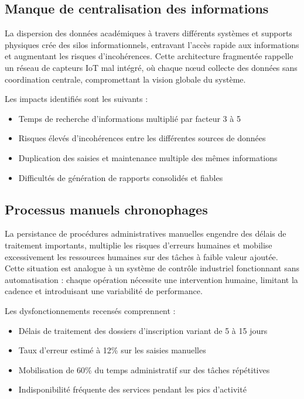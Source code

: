 \documentclass[12pt,a4paper]{report}
\begin{document}
\subsection{Manque de centralisation des informations}

La dispersion des données académiques à travers différents systèmes et supports physiques crée des silos informationnels, entravant l'accès rapide aux informations et augmentant les risques d'incohérences. Cette architecture fragmentée rappelle un réseau de capteurs IoT mal intégré, où chaque nœud collecte des données sans coordination centrale, compromettant la vision globale du système.

Les impacts identifiés sont les suivants :
\begin{itemize}
    \item Temps de recherche d'informations multiplié par facteur 3 à 5
    \item Risques élevés d'incohérences entre les différentes sources de données
    \item Duplication des saisies et maintenance multiple des mêmes informations
    \item Difficultés de génération de rapports consolidés et fiables
\end{itemize}

\subsection{Processus manuels chronophages}

La persistance de procédures administratives manuelles engendre des délais de traitement importants, multiplie les risques d'erreurs humaines et mobilise excessivement les ressources humaines sur des tâches à faible valeur ajoutée. Cette situation est analogue à un système de contrôle industriel fonctionnant sans automatisation : chaque opération nécessite une intervention humaine, limitant la cadence et introduisant une variabilité de performance.

Les dysfonctionnements recensés comprennent :
\begin{itemize}
    \item Délais de traitement des dossiers d'inscription variant de 5 à 15 jours
    \item Taux d'erreur estimé à 12\% sur les saisies manuelles
    \item Mobilisation de 60\% du temps administratif sur des tâches répétitives
    \item Indisponibilité fréquente des services pendant les pics d'activité
\end{itemize}
\end{document}
